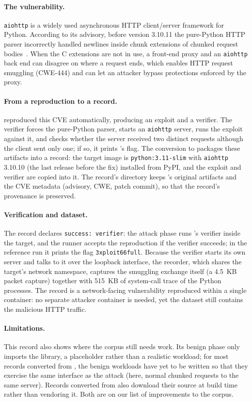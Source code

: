 \paragraph{The vulnerability.}
\texttt{aiohttp} is a widely used asynchronous HTTP client/server framework
for Python. According to its advisory, before version 3.10.11 the
pure-Python HTTP parser incorrectly handled newlines inside chunk extensions
of chunked request bodies~\cite{cve}. When the C extensions are not in use,
a front-end proxy and an \texttt{aiohttp} back end can disagree on where a
request ends, which enables HTTP request smuggling (CWE-444) and can let an
attacker bypass protections enforced by the proxy.

\paragraph{From a \genie reproduction to a record.}
\genie reproduced this CVE automatically, producing an exploit and a
verifier. The verifier forces the pure-Python parser, starts an
\texttt{aiohttp} server, runs the exploit against it, and checks whether the
server received two distinct requests although the client sent only one;
if so, it prints \genie's flag. The conversion to \cvexthree packages these
artifacts into a record: the target image is \texttt{python:3.11-slim} with
\texttt{aiohttp} 3.10.10 (the last release before the fix) installed from
PyPI, and the exploit and verifier are copied into it. The record's
 directory keeps \genie's original artifacts and the CVE
metadata (advisory, CWE, patch commit), so that the record's provenance is
preserved.

\paragraph{Verification and dataset.}
The record declares \texttt{success: verifier}: the attack phase runs
\genie's verifier inside the target, and the runner accepts the
reproduction if the verifier succeeds; in the reference run it prints the
flag \texttt{3xploit66full}. Because the verifier starts its own server and
talks to it over the loopback interface, the recorder, which shares the
target's network namespace, captures the smuggling exchange itself (a
4.5~KB packet capture) together with 515~KB of system-call trace of the
Python processes. The record is a network-facing vulnerability reproduced
within a single container: no separate attacker container is needed, yet
the dataset still contains the malicious HTTP traffic.

\paragraph{Limitations.}
This record also shows where the corpus still needs work. Its benign phase
only imports the library, a placeholder rather than a realistic workload;
for most records converted from \genie, the benign workloads have yet to be
written so that they exercise the same interface as the attack (here, normal
chunked requests to the same server). Records converted from \genie also
download their source at build time rather than vendoring it. Both are on
our list of improvements to the corpus.
